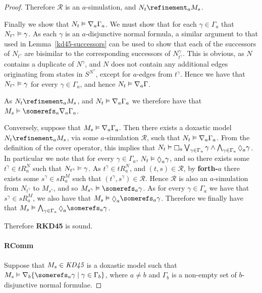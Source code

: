 \begin{proof}
Therefore $\mathcal{R}$ is an $a$-simulation, and $N_t \refinement_a M_s$. 

Finally we show that $N_t \vDash \nabla_a \Gamma_a$. We must show that for
each $\gamma \in \Gamma_a$ that $N_{t^\gamma} \vDash \gamma$. As each $\gamma$
is an $a$-disjunctive normal formula, a similar argument to that used in
Lemma~\ref{kd45-successors} can be used to show that each of the successors of
$N_{t^\gamma}$ are bisimilar to the corresponding successors of
$N^\gamma_{t^\gamma}$. This is obvious, as $N$ contains a duplicate of
$N^\gamma$, and $N$ does not contain any additional edges originating from
states in $S^{N^\gamma}$, except for $a$-edges from $t^\gamma$. Hence we have
that $N_{t^\gamma} \vDash \gamma$ for every $\gamma \in \Gamma_a$, and hence
$N_t \vDash \nabla_a \Gamma$.

As $N_t \refinement_a M_s$, and $N_t \vDash \nabla_a \Gamma_a$ we therefore
have that $M_s \entails \somerefs_a \covers_a \Gamma_a$.

Conversely, suppose that $M_s \vDash \nabla_a \Gamma_a$. Then there exists a
doxastic model $N_t \refinement_a M_s$, via some $a$-simulation $\mathcal{R}$,
such that $N_t \vDash \nabla_a \Gamma_a$. From the definition of the cover
operator, this implies that $N_t \entails \knows_a \bigvee_{\gamma \in \Gamma_a}
\gamma \land \bigwedge_{\gamma \in \Gamma_a} \suspects_a \gamma$. In particular we
note that for every $\gamma \in \Gamma_a$, $N_t \entails \suspects_a \gamma$, and
so there exists some $t^\gamma \in tR^N_a$ such that $N_{t^\gamma} \vDash
\gamma$. As $t^\gamma \in tR^N_a$, and $(t, s) \in \mathcal{R}$, by {\bf
forth-$a$} there exists some $s^\gamma \in sR^M_a$ such that $(t^\gamma, s^\gamma)
\in \mathcal{R}$. Hence $\mathcal{R}$ is also an $a$-simulation from
$N_{t^\gamma}$ to $M_{s^\gamma}$, and so $M_{s^\gamma} \entails \somerefs_a
\gamma$. As for every $\gamma \in \Gamma_a$ we have that $s^\gamma \in sR^M_a$, we
also have that $M_s \entails \suspects_a \somerefs_a \gamma$. Therefore we
finally have that $M_s \entails \bigwedge_{\gamma \in \Gamma_a} \suspects_a
\somerefs_a \gamma$.

Therefore {\bf RKD45} is sound.

\paragraph{RComm} 
Suppose that $M_s \in \textit{KD45}$ is a doxastic model such that $M_s \entails
\covers_b \{ \somerefs_a \gamma \mid \gamma \in \Gamma_b\}$, where $a \ne b$ and
$\Gamma_b$ is a non-empty set of $b$-disjunctive normal formulae. 


\end{proof}
